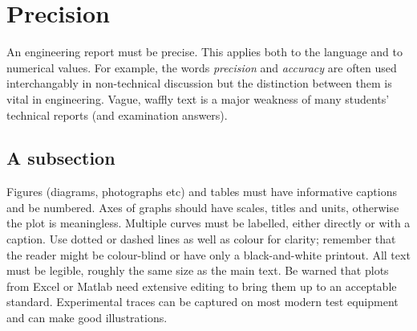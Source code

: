 \section{Precision}

An engineering report must be precise. This applies both to the language and to numerical values. For example, the words \emph{precision} and \emph{accuracy} are often used interchangably in non-technical discussion but the distinction between them is vital in engineering. Vague, waffly text is a major weakness of many students' technical reports (and examination answers).

\subsection{A subsection}

Figures (diagrams, photographs etc) and tables must have informative captions and be numbered. Axes of graphs should have scales, titles and units, otherwise the plot is meaningless. Multiple curves must be labelled, either directly or with a caption. Use dotted or dashed lines as well as colour for clarity; remember that the reader might be colour-blind or have only a black-and-white printout. All text must be legible, roughly the same size as the main text. Be warned that plots from Excel or Matlab need extensive editing to bring them up to an acceptable standard. Experimental traces can be captured on most modern test equipment and can make good illustrations.
